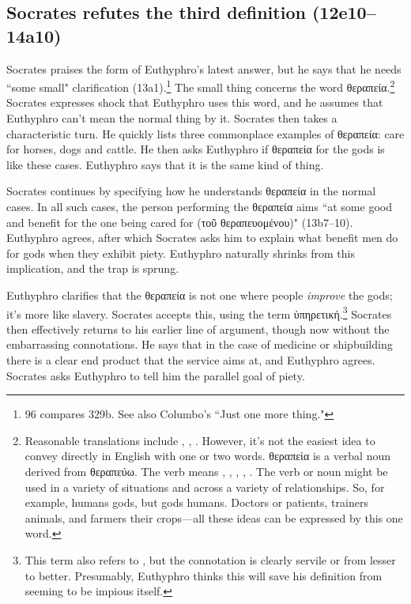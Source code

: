 \documentclass[11pt]{article}
\begin{document}

\subsection{Socrates refutes the third definition (12e10--14a10)}

Socrates praises the form of Euthyphro's latest answer, but he says that he
needs ``some small" clarification (13a1).\footnote{\citet{bailly2003} 96
compares  329b.  See also Columbo's ``Just one more
thing."} The small thing concerns the word {\g θεραπεία}.\footnote{
Reasonable translations include , ,
.  However, it's not the easiest idea to convey directly
in English with one or two words.  {\g θεραπεία} is a verbal noun derived
from {\g θεραπεύω}.  The verb means , ,
, , .  The verb or
noun might be used in a variety of situations and across a variety of
relationships.  So, for example, humans  gods, but gods
 humans.  Doctors  or 
patients, trainers  animals, and farmers  their
crops---all these ideas can be expressed by this one word.}  Socrates
expresses shock that Euthyphro uses this word, and he assumes that Euthyphro
can't mean the normal thing by it.  Socrates then takes a characteristic
turn.  He quickly lists three commonplace examples of {\g θεραπεία}: care
for horses, dogs and cattle.  He then asks Euthyphro if θεραπεία for the
gods is like these cases.  Euthyphro says that it is the same kind of
thing.

Socrates continues by specifying how he understands {\g θεραπεία} in the
normal cases.  In all such cases, the person performing the {\g θεραπεία}
aims ``at some good and benefit for the one being cared for ({\g τοῦ
θεραπευομένου})" (13b7--10).  Euthyphro agrees, after which Socrates asks
him to explain what benefit men do for gods when they exhibit piety.
Euthyphro naturally shrinks from this implication, and the trap is sprung.

Euthyphro clarifies that the {\g θεραπεία} is not one where people
\emph{improve} the gods; it's more like slavery.  Socrates accepts this,
using the term {\g ὑπηρετική}.\footnote{This term also refers to
, but the connotation is clearly servile or from lesser
to better.  Presumably, Euthyphro thinks this will save his definition from
seeming to be impious itself.}  Socrates then effectively returns to his
earlier line of argument, though now without the embarrassing connotations.
He says that in the case of medicine or shipbuilding there is a clear end
product that the service aims at, and Euthyphro agrees.  Socrates asks
Euthyphro to tell him the parallel goal of piety.
\end{document}
